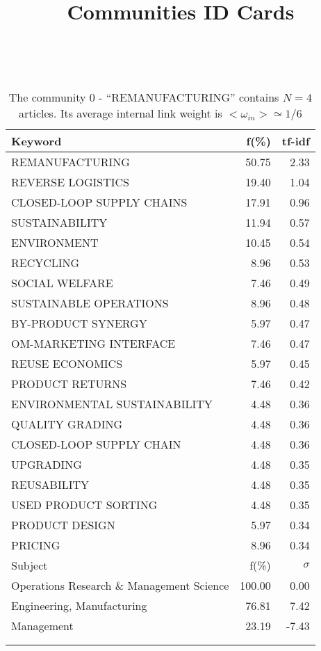 \documentclass[a4paper,11pt]{report}
\title{{\bf Communities ID Cards}}
\date{\begin{flushleft}This document gather the ``ID Cards'' of the CC communities found within your database.\\
 The CC network was built by keeping a link between articles sharing at least 5 references. The communities characterized here correspond to the ones found in the level 1 (in the sense of the Louvain algo) which gathers more than 0 articles.\\
 These ID cards displays the most frequent keywords, subject categories, journals of publication, institution, countries, authors, references and reference journals of the articles of each community. The significance of an item $\sigma = \sqrt{N} (f - p) / \sqrt{p(1-p)}$ [where $N$ is the number of articles within the community and $f$ and $p$ are the proportion of articles respectively within the community and within the database displaying that item ] is also given (for example $\sigma > 5$ is really highly significant). The tf-idf value which can be calculated by $tf-idf = f*log(frac{1}{p})$ is also given.\\
\vspace{1cm}
\copyright Sebastian Grauwin, Liu Weizhi - (2014) \end{flushleft}}
\begin{document}
\begin{landscape}
\maketitle
\clearpage

\begin{table}[!ht]
\caption{The community 0 - ``REMANUFACTURING'' contains $N = 4$ articles. Its average internal link weight is $<\omega_{in}> \simeq 1/6$ }
\textcolor{white}{aa}\\
{\scriptsize\begin{tabular}{|l r  r|}
\hline
Keyword & f(\%) & tf-idf \\
\hline
REMANUFACTURING & 50.75 & 2.33\\
REVERSE LOGISTICS & 19.40 & 1.04\\
CLOSED-LOOP SUPPLY CHAINS & 17.91 & 0.96\\
SUSTAINABILITY & 11.94 & 0.57\\
ENVIRONMENT & 10.45 & 0.54\\
RECYCLING & 8.96 & 0.53\\
SOCIAL WELFARE & 7.46 & 0.49\\
SUSTAINABLE OPERATIONS & 8.96 & 0.48\\
BY-PRODUCT SYNERGY & 5.97 & 0.47\\
OM-MARKETING INTERFACE & 7.46 & 0.47\\
REUSE ECONOMICS & 5.97 & 0.45\\
PRODUCT RETURNS & 7.46 & 0.42\\
ENVIRONMENTAL SUSTAINABILITY & 4.48 & 0.36\\
QUALITY GRADING & 4.48 & 0.36\\
CLOSED-LOOP SUPPLY CHAIN & 4.48 & 0.36\\
UPGRADING & 4.48 & 0.35\\
REUSABILITY & 4.48 & 0.35\\
USED PRODUCT SORTING & 4.48 & 0.35\\
PRODUCT DESIGN & 5.97 & 0.34\\
PRICING & 8.96 & 0.34\\
\hline
\hline
Subject & f(\%) & $\sigma$\\
\hline
Operations Research \& Management Science & 100.00 & 0.00\\
Engineering, Manufacturing & 76.81 & 7.42\\
Management & 23.19 & -7.43\\
 &  & \\
 &  & \\

\end{tabular}}
\end{table}
\end{landscape}
\end{document}
